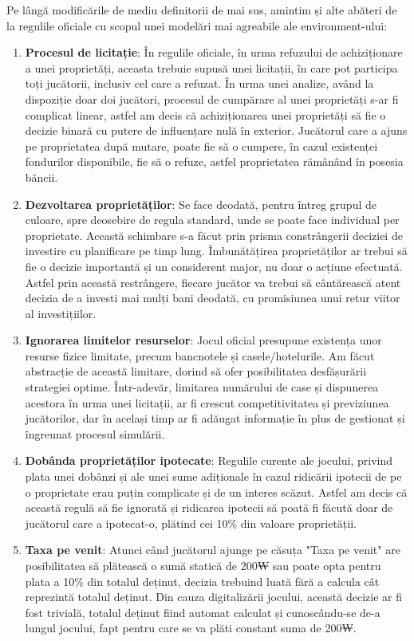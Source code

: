 Pe lângă modificările de mediu definitorii de mai sus, amintim și alte abăteri de la regulile oficiale cu scopul unei modelări mai agreabile ale environment-ului:
\begin{enumerate}
    \item \textbf{Procesul de licitație}: În regulile oficiale, în urma refuzului de achiziționare a unei proprietăți, aceasta trebuie supusă unei licitații, în care pot participa toți jucătorii, inclusiv cel care a refuzat. În urma unei analize, având la dispoziție doar doi jucători, procesul de cumpărare al unei proprietăți s-ar fi complicat linear, astfel am decis că achiziționarea unei proprietăți să fie o decizie binară cu putere de influențare nulă în exterior. Jucătorul care a ajuns pe proprietatea după mutare, poate fie să o cumpere, în cazul existenței fondurilor disponibile, fie să o refuze, astfel proprietatea rămânând în posesia băncii.
    \item \textbf{Dezvoltarea proprietăților}: Se face deodată, pentru întreg grupul de culoare, spre deosebire de regula standard, unde se poate face individual per proprietate. Această schimbare s-a făcut prin prisma constrângerii deciziei de investire cu planificare pe timp lung. Îmbunătățirea proprietăților ar trebui să fie o decizie importantă și un considerent major, nu doar o acțiune efectuată. Astfel prin această restrângere, fiecare jucător va trebui să cântărească atent decizia de a investi mai mulți bani deodată, cu promisiunea unui retur viitor al investițiilor.
    \item \textbf{Ignorarea limitelor resurselor}: Jocul oficial presupune existența unor resurse fizice limitate, precum bancnotele și casele/hotelurile. Am făcut abstracție de această limitare, dorind să ofer posibilitatea desfășurării strategiei optime. Într-adevăr, limitarea numărului de case și dispunerea acestora în urma unei licitații, ar fi crescut competitivitatea și previziunea jucătorilor, dar în același timp ar fi adăugat informație în plus de gestionat și îngreunat procesul simulării.
    \item \textbf{Dobânda proprietăților ipotecate}: Regulile curente ale jocului, privind plata unei dobânzi și ale unei sume adiționale în cazul ridicării ipotecii de pe o proprietate erau puțin complicate și de un interes scăzut. Astfel am decis că această regulă să fie ignorată și ridicarea ipotecii să poată fi făcută doar de jucătorul care a ipotecat-o, plătind cei 10\% din valoare proprietății.
    \item \textbf{Taxa pe venit}: Atunci când jucătorul ajunge pe căsuța "Taxa pe venit" are posibilitatea să plătească o sumă statică de 200₩ sau poate opta pentru plata a 10\% din totalul deținut, decizia trebuind luată fără a calcula cât reprezintă totalul deținut. Din cauza digitalizării jocului, această decizie ar fi fost trivială, totalul deținut fiind automat calculat și cunoscându-se de-a lungul jocului, fapt pentru care se va plăti constant suma de 200₩.

\end{enumerate}
